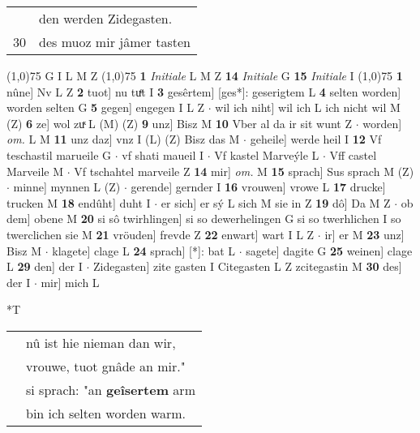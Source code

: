 \documentclass[8pt,a4paper,notitlepage]{article}
\begin{document}
\begin{table}[ht]
\begin{minipage}[t]{0.5\linewidth}
\begin{tabular}{rl}
 & den werden Zidegasten.\\ 
30 & des muoz mir jâmer tasten\\ 
\end{tabular}
\scriptsize
\line(1,0){75} \newline
G I L M Z \newline
\line(1,0){75} \newline
\textbf{1} \textit{Initiale} L M Z  \textbf{14} \textit{Initiale} G  \textbf{15} \textit{Initiale} I  \newline
\line(1,0){75} \newline
\textbf{1} nûne] Nv L Z \textbf{2} tuot] nu tuͤt I \textbf{3} gesêrtem] [ges*]: geserigtem L \textbf{4} selten worden] worden selten G \textbf{5} gegen] engegen I L Z  $\cdot$ wil ich niht] wil ich L ich nicht wil M (Z) \textbf{6} ze] wol zuͯ L (M) (Z) \textbf{9} unz] Bisz M \textbf{10} Vber al da ir sit wunt Z  $\cdot$ worden] \textit{om.} L M \textbf{11} unz daz] vnz I (L) (Z) Bisz das M  $\cdot$ geheile] werde heil I \textbf{12} Vf teschastil marueile G  $\cdot$ vf shati maueil I  $\cdot$ Vf kastel Marveýle L  $\cdot$ Vff castel Marveile M  $\cdot$ Vf tschahtel marveile Z \textbf{14} mir] \textit{om.} M \textbf{15} sprach] Sus sprach M (Z)  $\cdot$ minne] mynnen L (Z)  $\cdot$ gerende] gernder I \textbf{16} vrouwen] vrowe L \textbf{17} drucke] trucken M \textbf{18} endûht] duht I  $\cdot$ er sich] er sý L sich M sie in Z \textbf{19} dô] Da M Z  $\cdot$ ob dem] obene M \textbf{20} si sô twirhlingen] si so dewerhelingen G si so twerhlichen I so twerclichen sie M \textbf{21} vröuden] frevde Z \textbf{22} enwart] wart I L Z  $\cdot$ ir] er M \textbf{23} unz] Bisz M  $\cdot$ klagete] clage L \textbf{24} sprach] [*]: bat L  $\cdot$ sagete] dagite G \textbf{25} weinen] clage L \textbf{29} den] der I  $\cdot$ Zidegasten] zite gasten I Citegasten L Z zcitegastin M \textbf{30} des] der I  $\cdot$ mir] mich L \newline
\end{minipage}
\hspace{0.5cm}
\begin{minipage}[t]{0.5\linewidth}
\small
\begin{center}*T
\end{center}
\begin{tabular}{rl}
 & nû ist hie nieman dan wir,\\ 
 & vrouwe, tuot gnâde an mir."\\ 
 & si sprach: "an \textbf{geîsertem} arm\\ 
 & bin ich selten worden warm.\\ 

\end{tabular}
\end{minipage}
\end{table}
\end{document}
